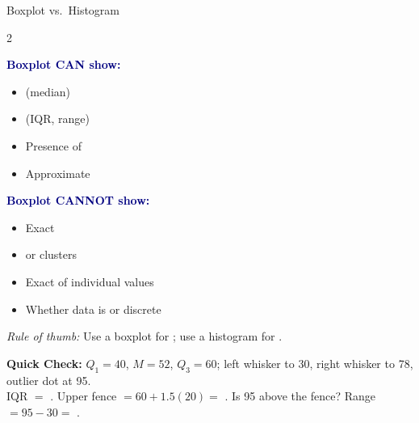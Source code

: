 \documentclass[10pt]{article}
\begin{document}
\vspace{0.08in}

\boxguard
\begin{notesbox}{Boxplot vs.\ Histogram}
\small
\begin{multicols}{2}

\textbf{\textcolor{navy}{Boxplot CAN show:}}
\begin{itemize}[itemsep=3pt]
  \item {} (median)
  \item {} (IQR, range)
  \item Presence of 
  \item Approximate 
\end{itemize}

\columnbreak

\textbf{\textcolor{navy}{Boxplot CANNOT show:}}
\begin{itemize}[itemsep=3pt]
  \item Exact 
  \item {} or clusters
  \item Exact  of individual values
  \item Whether data is  or discrete
\end{itemize}

\end{multicols}

\vspace{4pt}
\textit{Rule of thumb:} Use a boxplot for ;
use a histogram for .
\end{notesbox}

\vspace{0.08in}

\begin{tcolorbox}[colback=goldbg, colframe=goldacc, boxrule=0.8pt, arc=2mm,
    left=4mm, right=4mm, top=2mm, bottom=2mm]
\small\textbf{Quick Check:} $Q_1 = 40$, $M = 52$, $Q_3 = 60$; left whisker to 30,
right whisker to 78, outlier dot at 95.\\[4pt]
IQR $= $ . \quad
Upper fence $= 60 + 1.5(20) = $ . \quad
Is 95 above the fence?  \quad
Range $= 95 - 30 = $ .
\end{tcolorbox}
\end{document}
